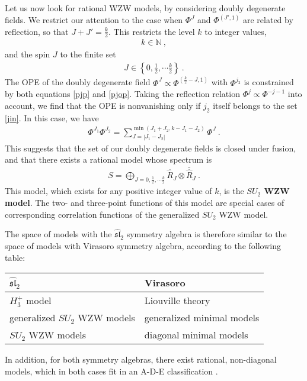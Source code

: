 \documentclass[12pt,a4paper,notitlepage]{report}
\numberwithin{equation}{section}
\theoremstyle{break}
\begin{document}
Let us now look for rational WZW models, by considering doubly degenerate fields.
We restrict our attention to the case when $\Phi^{J}$ and $\Phi^{(J',1)}$ are related by reflection, so that $J+J'=\frac{k}{2}$.
This restricts the level $k$ to integer values,  
\begin{align}
 \boxed{k\in {\mathbb{N}}}\ ,
\end{align}
and the spin $J$ to the finite set 
\begin{align}
 J\in \left\{0,\frac12,\cdots \frac{k}{2}\right\}\ .
\label{jin}
\end{align}
The OPE of the doubly degenerate field $\Phi^J \propto \Phi^{(\frac{k}{2}-J,1)}$ with $\Phi^{j_2}$ is constrained by both equations \eqref{pjp} and \eqref{pjop}.
Taking the reflection relation $\Phi^j\propto \Phi^{-j-1}$ into account, we find that the OPE is nonvanishing only if $j_2$ itself belongs to the set \eqref{jin}.
In this case, we have 
\begin{align}
\boxed{\Phi^{J_1}\Phi^{J_2} = \sum_{J=|J_1-J_2|}^{\operatorname{min}(J_1+J_2,k-J_1-J_2)} \Phi^J}\ .
\end{align}
This suggests that the set of our doubly degenerate fields is closed under fusion, and that there exists a rational model whose spectrum is
\begin{align}
 \boxed{S = \bigoplus_{J=0,\frac12,\cdots \frac{k}{2}} \hat{R}_J \otimes \bar{\hat{R}}_J}\ .
\end{align}
This model, which exists for any positive integer value of $k$, is the \textbf{\boldmath $SU_2$ WZW model}.
The two- and three-point functions of this model are special cases of corresponding correlation functions of the generalized $SU_2$ WZW model. 

The space of models with the $\widehat{\mathfrak{sl}}_2$ symmetry algebra is therefore similar to the space of models with Virasoro symmetry algebra, according to the following table:
\begin{center}
\renewcommand{\arraystretch}{1.3}
 \begin{tabular}{|l|l|}
  \hline
 $\widehat{\mathfrak{sl}}_2$  & Virasoro 
\\
\hline
$H_3^+$ model & Liouville theory 
\\
generalized $SU_2$ WZW models & generalized minimal models
\\
$SU_2$ WZW models & diagonal minimal models
\\
\hline
 \end{tabular}
\end{center}
In addition, for both symmetry algebras, there exist rational, non-diagonal models, which in both cases fit in an A-D-E classification \cite{fms97}. 
\end{document}
